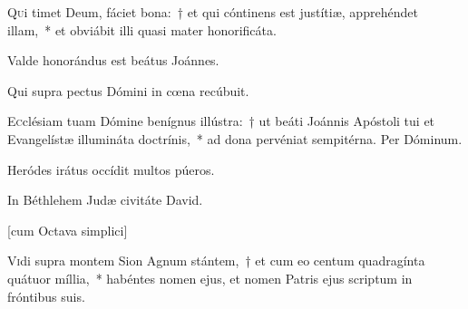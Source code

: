 \documentclass[vesperale_romanum.tex]{subfiles}
\begin{document}
\lettrine{Q}{u}i timet Deum, fáciet bona:~† et qui cóntinens est justítiæ, apprehéndet illam,~* et obviábit illi quasi mater honorificáta.

\hymnus


\vv Valde honorándus est beátus Joánnes.

\rr Qui supra pectus Dómini in cœna recúbuit.


\oratio \label{oratio_s_joannis_dec_27} 

\lettrine{E}{c}clésiam tuam Dómine benígnus illústra:~† ut beáti Joánnis Apóstoli tui et Evangelístæ illumináta doctrínis,~* ad dona pervéniat sempitérna.
Per Dóminum.


\label{an_hi_sunt_qui_cum_mulieribus_solesmes_1961}


\vv Heródes irátus occídit multos púeros.

\rr In Béthlehem Judæ civitáte David.




\label{dec_28} 



[cum Octava simplici]


\lettrine{V}{i}di supra montem Sion Agnum stántem,~† et cum eo centum quadragínta quátuor míllia,~* habéntes nomen ejus, et nomen Patris ejus scriptum in fróntibus suis.

\hymnus

\end{document}
